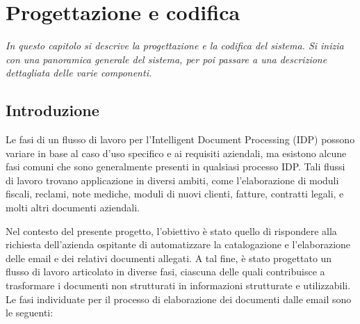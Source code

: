 \chapter{Progettazione e codifica}
\label{cap:progettazione-codifica}

\emph{In questo capitolo si descrive la progettazione e la codifica del sistema. Si inizia con una panoramica generale del sistema, per poi passare a una descrizione dettagliata delle varie componenti.}

\section{Introduzione}
Le fasi di un flusso di lavoro per l'Intelligent Document Processing (IDP) possono variare in base al caso d'uso specifico e ai requisiti aziendali, ma esistono alcune fasi comuni che sono generalmente presenti in qualsiasi processo IDP. Tali flussi di lavoro trovano applicazione in diversi ambiti, come l'elaborazione di moduli fiscali, reclami, note mediche, moduli di nuovi clienti, fatture, contratti legali, e molti altri documenti aziendali. 

Nel contesto del presente progetto, l'obiettivo è stato quello di rispondere alla richiesta dell'azienda ospitante di automatizzare la catalogazione e l'elaborazione delle email e dei relativi documenti allegati. A tal fine, è stato progettato un flusso di lavoro articolato in diverse fasi, ciascuna delle quali contribuisce a trasformare i documenti non strutturati in informazioni strutturate e utilizzabili. Le fasi individuate per il processo di elaborazione dei documenti dalle email sono le seguenti:

